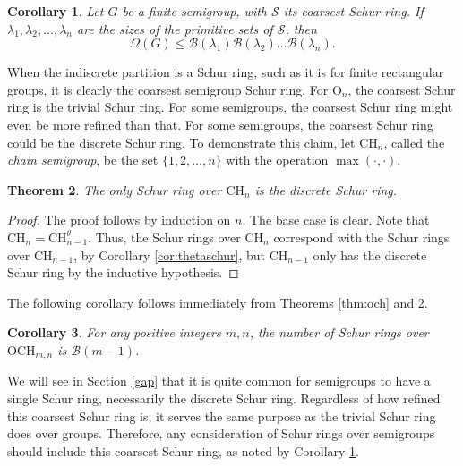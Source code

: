 \documentclass{article}
\theoremstyle{plain}
\newtheorem{Thm}{Theorem}[section]
\newtheorem{Cor}[Thm]{Corollary}
\theoremstyle{definition}
\newcommand{\corref}[1]{Corollary \ref{#1}}
\renewcommand{\S}{\mathcal{S}}
\newcommand{\B}{\mathscr{B}}
\renewcommand{\O}{\mathrm{O}}
\newcommand{\CH}{\mathrm{CH}}
\newcommand{\OCH}{\mathrm{OCH}}
\begin{document}
\begin{Cor}\label{cor:omegabound}
Let $G$ be a finite semigroup, with $\S$ its coarsest Schur ring. If $\lambda_1,\lambda_2, \ldots, \lambda_n$ are the sizes of the primitive sets of $\S$, then
$$
\Omega(G) \leq \B(\lambda_1)\B(\lambda_2)\ldots\B(\lambda_n).
$$
\end{Cor}

When the indiscrete partition is a Schur ring, such as it is for finite rectangular groups, it is clearly the coarsest semigroup Schur ring. For $\O_n$, the coarsest Schur ring is the trivial Schur ring. For some semigroups, the coarsest Schur ring might even be more refined than that. For some semigroups, the coarsest Schur ring could be the discrete Schur ring. To demonstrate this claim, let \label{ch} $\CH_n$, called the \emph{chain semigroup}, be the set $\{1, 2, \ldots, n\}$ with the operation $\max(\cdot,\cdot)$. 

\begin{Thm}\label{thm:chainschur}
The only Schur ring over $\CH_n$ is the discrete Schur ring.
\end{Thm}
\begin{proof}
    The proof follows by induction on $n$. The base case is clear. Note that $\CH_n = \CH_{n-1}^\theta$. Thus, the Schur rings over $\CH_n$ correspond with the Schur rings over $\CH_{n-1}$, by \corref{cor:thetaschur}, but $\CH_{n-1}$ only has the discrete Schur ring by the inductive hypothesis.
\end{proof}

The following corollary follows immediately from Theorems \ref{thm:och} and \ref{thm:chainschur}.

\begin{Cor}\label{cor:och} For any positive integers $m,n$, the number of Schur rings over $\OCH_{m,n}$ is $\B(m-1)$.
\end{Cor}\label{och}

We will see in Section \ref{gap} that it is quite common for semigroups to have a single Schur ring, necessarily the discrete Schur ring. Regardless of how refined this coarsest Schur ring is, it serves the same purpose as the trivial Schur ring does over groups. Therefore, any consideration of Schur rings over semigroups should include this coarsest Schur ring, as noted by \corref{cor:omegabound}. 
\end{document}

